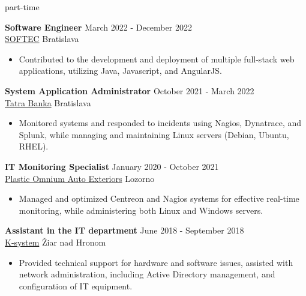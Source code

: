 \documentclass[12pt]{article}
\begin{document}
\begin{center}
    {part-time} \\
\end{center}

\noindent
{\bfseries Software Engineer} \hfill March 2022 - December 2022 \\[0.04in]  
\noindent \href{https://www.softec.sk/en/about-us}{SOFTEC} \hfill Bratislava 
\begin{itemize} \itemsep -2pt %
	\item Contributed to the development and deployment of multiple full-stack web applications, utilizing Java, Javascript, and AngularJS.
\end{itemize}

\vspace{0.12in}

\noindent
{\bfseries System Application Administrator} \hfill October 2021 - March 2022 \\[0.04in]  
\noindent \href{https://www.tatrabanka.sk/en/about-bank/about-tatra-banka/}{Tatra Banka} \hfill Bratislava 
\begin{itemize} \itemsep -2pt %
\item Monitored systems and responded to incidents using Nagios, Dynatrace, and Splunk, while managing and maintaining Linux servers (Debian, Ubuntu, RHEL).
\end{itemize}

\vspace{0.12in}

\noindent
{\bfseries IT Monitoring Specialist} \hfill January 2020 - October 2021 \\[0.04in]  
\noindent \href{https://www.opmobility.com/en/plastic-omnium-is-now-opmobility/}{Plastic Omnium Auto Exteriors} \hfill Lozorno 
\begin{itemize} \itemsep -2pt %
\item Managed and optimized Centreon and Nagios systems for effective real-time monitoring, while administering both Linux and Windows servers.
\end{itemize}

\vspace{0.12in}

\noindent
{\bfseries Assistant in the IT department} \hfill June 2018 - September 2018 \\
\noindent  \href{https://www.ksystem.sk/}{K-system} \hfill Žiar nad Hronom   
\begin{itemize} \itemsep -2pt %
\item Provided technical support for hardware and software issues, assisted with network administration, including Active Directory management, and configuration of IT equipment.
\end{itemize}
\end{document}
